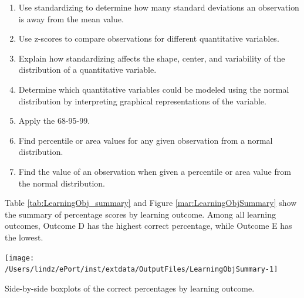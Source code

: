 \documentclass[12pt,english,nohyper]{tufte-handout}\usepackage[]{graphicx}\usepackage[]{color}
\newenvironment{knitrout}{}{} %
\begin{document}
\bigskip{}

\begin{fullwidth}
\begin{enumerate}[label=\Alph*.,itemsep=-\parsep,leftmargin=*]
  \item
Use standardizing to determine how many standard deviations an observation is away from the mean value.
\item Use z-scores to compare observations for different quantitative variables.
\item Explain how standardizing affects the shape, center, and variability of the distribution of a quantitative variable.
\item Determine which quantitative variables could be modeled using the normal distribution by interpreting graphical representations of the variable.
\item Apply the 68-95-99.
\item Find percentile or area values for any given observation from a normal distribution.
\item Find the value of an observation when given a percentile or area value from the normal distribution.

\end{enumerate}
\end{fullwidth}

\newpage{}

Table \ref{tab:LearningObj_summary} and Figure \ref{mar:LearningObjSummary} show the summary of percentage scores by learning outcome.
Among all learning outcomes, Outcome
D
has the highest correct percentage, while Outcome
E
has the lowest.



\begin{knitrout}
\color{fgcolor}\begin{marginfigure}
\texttt{[image: /Users/lindz/ePort/inst/extdata/OutputFiles/LearningObjSummary-1]} \caption[Side-by-side boxplots of the correct percentages by learning outcome]{Side-by-side boxplots of the correct percentages by learning outcome.}\label{mar:LearningObjSummary}
\end{marginfigure}


\end{knitrout}
\end{document}
